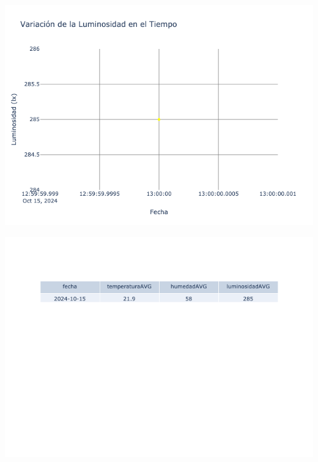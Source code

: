 \documentclass{article}
\begin{document}
    \noindent
    \begin{minipage}{0.48\textwidth}
        \centering
        \includegraphics[width=\textwidth]{../img/poli/LS601-90Dias-03-12-2024.png}
    \end{minipage}
    \hfill
    \begin{minipage}{0.48\textwidth}
        \centering
        \includegraphics[width=\textwidth]{../img/tables/CAVG601-90Dias-03-12-2024.png}
    \end{minipage}
    
\end{document}
